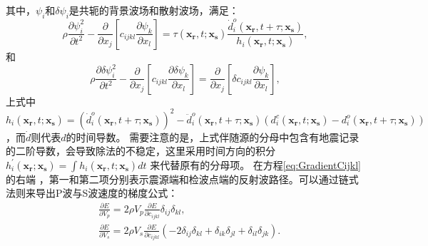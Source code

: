 其中，$\psi_i$和$\delta \psi_i$是共轭的背景波场和散射波场，满足：
\begin{equation}
    \rho \frac{\partial \psi^2_i}{\partial t^2}  -
    \frac{\partial}{\partial x_j}\left[ 
        c_{ijkl}\frac{\partial \psi_{k}}{\partial
        x_l}\right]=\tau(\mathbf{x_r},t;\mathbf{x_s})\frac{\dot{d}^o_i(\mathbf{x_r},t+\tau;\mathbf{x_s})}{h_i(\mathbf{x_r},t;\mathbf{x_s})},
    \label{eq:AdjointWE} 
\end{equation}
和
\begin{equation}
    \rho \frac{\partial \delta \psi^2_i}{\partial t^2}  -
    \frac{\partial}{\partial x_j}\left[ 
        c_{ijkl}\frac{\partial \delta \psi_{k}}{\partial 
        x_l}\right]=\frac{\partial}{\partial x_j}\left[\delta c_{ijkl}\frac{\partial
        \psi_{k}}{\partial x_l}\right], 
    \label{eq:AdjointDeltaWE} 
\end{equation}
上式中$h_i(\mathbf{x_r},t;\mathbf{x_s})=(\dot{d}^o_i(\mathbf{x_r},t+\tau;\mathbf{x_s}))^2-\ddot{d}^o_i(\mathbf{x_r},t+\tau;\mathbf{x_s})
(d^c_i(\mathbf{x_r},t;\mathbf{x_s})-d^o_i(\mathbf{x_r},t+\tau;\mathbf{x_s}))$，而$\dot{d}$则代表$d$的时间导数。
需要注意的是，上式伴随源的分母中包含有地震记录的二阶导数，会导致除法的不稳定，这里采用时间方向的积分
$h^{'}_i(\mathbf{x_r};\mathbf{x_s})=\int h_i(\mathbf{x_r},t;\mathbf{x_s})dt$
来代替原有的分母项\cite{Fu2015}。
在方程\eqref{eq:GradientCijkl}的右端
，第一和第二项分别表示震源端和检波点端的反射波路径。可以通过链式法则来导出P波与S波速度的梯度公式：
\begin{equation}
\begin{split}
    &\frac{\partial E}{\partial V_p}=2\rho V_p\frac{\partial E}{\partial
        c_{ijkl}}\delta_{ij}\delta_{kl}, \\
    &\frac{\partial E}{\partial V_s}=2\rho V_s\frac{\partial
    E}{\partial c_{ijkl}}(-2\delta_{ij}\delta_{kl}+\delta_{ik}\delta_{jl}+
    \delta_{il}\delta_{jk}).
\end{split}
    \label{eq:GradientVel}
\end{equation}

